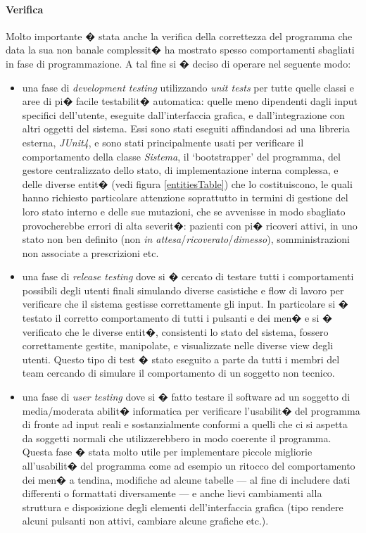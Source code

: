 \documentclass[final, smallexted]{svjour3}
\begin{document}
\paragraph{\textbf{Verifica}} Molto importante � stata anche la verifica della correttezza del programma che data la sua non banale complessit� ha mostrato spesso comportamenti sbagliati in fase di programmazione. A tal fine si � deciso di operare nel seguente modo: \begin{itemize}
	\item una fase di \textit{development testing} utilizzando \textit{unit tests} per tutte quelle classi e aree di pi� facile testabilit� automatica: quelle meno dipendenti dagli input specifici dell'utente, eseguite dall'interfaccia grafica, e dall'integrazione con altri oggetti del sistema. Essi sono stati eseguiti affindandosi ad una libreria esterna, \textit{JUnit4}, e sono stati principalmente usati per verificare il comportamento della classe \textit{Sistema}, il `bootstrapper' del programma, del gestore centralizzato dello stato, di implementazione interna complessa, e delle diverse entit� (vedi figura \ref{entitiesTable}) che lo costituiscono, le quali hanno richiesto particolare attenzione soprattutto  in termini di gestione del loro stato interno e delle sue mutazioni, che se avvenisse in modo sbagliato provocherebbe errori di alta severit�: pazienti con pi� ricoveri attivi, in uno stato non ben definito (non \textit{in attesa}/\textit{ricoverato}/\textit{dimesso}), somministrazioni non associate a prescrizioni etc.
	\item una fase di \textit{release testing} dove si � cercato di testare tutti i comportamenti possibili degli utenti finali simulando diverse casistiche e flow di lavoro per verificare che il sistema gestisse correttamente gli input. In particolare si � testato il corretto comportamento di tutti i pulsanti e dei men� e si � verificato che le diverse entit�, consistenti lo stato del sistema, fossero correttamente gestite, manipolate, e visualizzate nelle diverse view degli utenti. Questo tipo di test � stato eseguito a parte da tutti i membri del team cercando di simulare il comportamento di un soggetto non tecnico.
	\item una fase di \textit{user testing} dove si � fatto testare il software ad un soggetto di media/moderata abilit� informatica per verificare l'usabilit� del programma di fronte ad input reali e sostanzialmente conformi a quelli che ci si aspetta da soggetti normali che utilizzerebbero in modo coerente il programma. Questa fase � stata molto utile per implementare piccole migliorie all'usabilit� del programma come ad esempio un ritocco del comportamento dei men� a tendina, modifiche ad alcune tabelle --- al fine di includere dati differenti o formattati diversamente --- e anche lievi cambiamenti alla struttura e disposizione degli elementi dell'interfaccia grafica (tipo rendere alcuni pulsanti non attivi, cambiare alcune grafiche etc.). 
\end{itemize}
\end{document}
